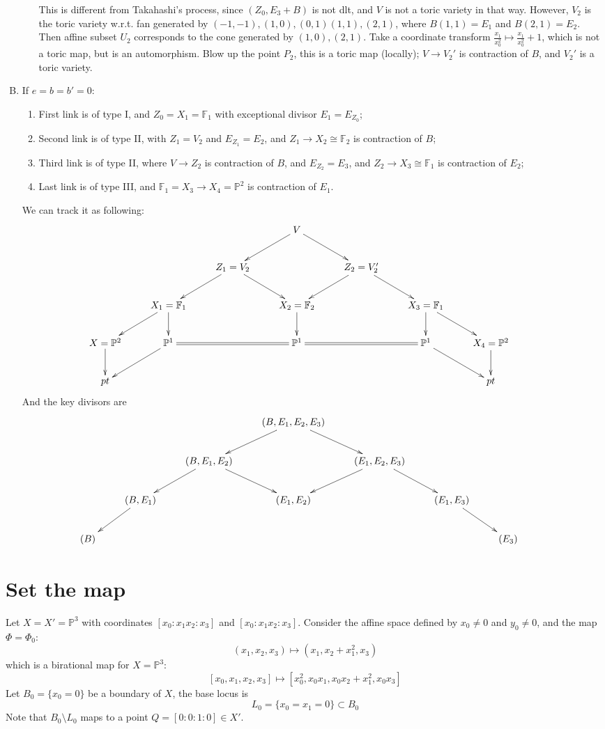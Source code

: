\documentclass{article}
\begin{document}
\begin{enumerate}[(A)]
\begin{enumerate}[(1)]
    This is different from Takahashi's process, since $ (Z_0,E_3+B) $ is not dlt, and $ V $ is not a toric variety in that way. However,  $ V_2 $ is the toric variety w.r.t. fan generated by $ (-1,-1),(1,0),(0,1)(1,1),(2,1) $, where $ B(1,1)=E_1 $ and $ B(2,1)=E_2 $. Then affine subset $ U_2 $ corresponds to the cone generated by $ (1,0),(2,1) $. Take a coordinate transform $ \frac{x_1}{x_0^2}\mapsto \frac{x_1}{x_0^2}+1 $, which is not a toric map, but is an automorphism. Blow up the point $ P_2 $, this is a toric map (locally); $ V\to V_2' $ is contraction of $ B $, and $ V_2' $ is a toric variety.
  \end{enumerate}
  \item If $ e=b=b'=0 $:
  \begin{enumerate}[(1)]
    \item First link is of type I, and $ Z_0=X_1=\mathbb{F}_1 $ with exceptional divisor $ E_1=E_{Z_0} $;
    \item Second link is of type II, with $ Z_1=V_2 $ and $ E_{Z_1}=E_2 $, and $ Z_1\to X_2\cong \mathbb{F}_2 $ is contraction of $ B $;
    \item Third link is of type II, where $ V\to Z_2 $ is contraction of $ B $, and $ E_{Z_2}=E_3 $, and $ Z_2\to X_3\cong \mathbb{F}_1 $ is contraction of $ E_2 $;
    \item Last link is of type III,  and $ \mathbb{F}_1=X_3\to X_4=\mathbb{P}^2 $ is contraction of  $ E_1 $.
  \end{enumerate}
We can track it as following:
$$ \xymatrix{
  &&&V\ar[ld]\ar[rd]&&&&\\
&&Z_1=V_2\ar[ld]\ar[rd]&&Z_2=V_2'\ar[ld]\ar[rd]\\
&X_1=\mathbb{F}_1\ar[d]\ar[ld]&&X_2=\mathbb{F}_2\ar[d]&&X_3=\mathbb{F}_1\ar[d]\ar[rd]\\
X=\mathbb{P}^2\ar[d]&\mathbb{P}^1\ar[ld]\ar@{=}[rr]&&\mathbb{P}^1\ar@{=}[rr]&&\mathbb{P}^1\ar[rd]&X_4=\mathbb{P}^2\ar[d]\\
pt&&&&&&pt} $$
And the key divisors are 
$$ \xymatrix{
  &&&(B,E_1,E_2,E_3)\ar[ld]\ar[rd]&&&&\\
  &&(B,E_1,E_2)\ar[ld]\ar[rd]&&(E_1,E_2,E_3)\ar[ld]\ar[rd]\\
  &(B,E_1)\ar[ld]&&(E_1,E_2)&&(E_1,E_3)\ar[rd]\\
  (B)&&&&&&(E_3)} $$
\end{enumerate}

\section{Set the map}
Let \(X=X'= \mathbb{P}^3 \) with coordinates \([x_0: x_1 x_2: x_3]\) and \([x_0: x_1 x_2: x_3]\). Consider the affine space defined by \(x_0 \neq 0\) and \(y_0 \neq 0\), and the map $ \Phi=\Phi_0 $:
\[
(x_1,x_2,x_3)\mapsto (x_1,x_2+x_1^2,x_3)
\]
which is a birational map for \(X=\mathbb{P}^3\):
\[
[x_0,x_1,x_2,x_3]\mapsto [x_0^2,x_0x_1,x_0x_2+x_1^2,x_0x_3]
\]
Let $ B_0=\{x_0=0\} $ be a boundary of $ X $, the base locus is
\[ L_0=\{x_0=x_1=0\}\subset B_0 \]
Note that $ B_0\setminus L_0  $ maps to a point $ Q=[0:0:1:0]\in X' $.
\end{document}
